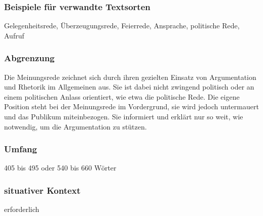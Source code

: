 \subsubsection{Beispiele für verwandte Textsorten}Gelegenheitsrede, Überzeugungsrede, Feierrede, Ansprache, politische Rede, Aufruf
\subsubsection{Abgrenzung} Die Meinungsrede zeichnet sich durch ihren gezielten Einsatz von
Argumentation und Rhetorik im Allgemeinen aus. Sie ist dabei nicht
zwingend politisch oder an einem politischen Anlass orientiert, wie
etwa die politische Rede. Die eigene Position steht bei der Meinungsrede im Vordergrund, sie wird jedoch untermauert und das Publikum
miteinbezogen. Sie informiert und erklärt nur so weit, wie notwendig,
um die Argumentation zu stützen.
\subsubsection{Umfang} 405 bis 495 oder 540 bis 660 Wörter
\subsubsection{situativer Kontext} erforderlich
